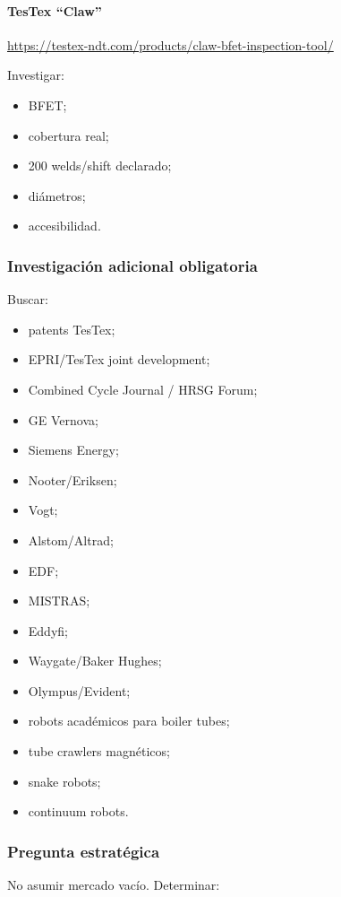 \documentclass[11pt,a4paper]{article}
\begin{document}
\paragraph*{TesTex ``Claw''}
\url{https://testex-ndt.com/products/claw-bfet-inspection-tool/}

Investigar:

\begin{itemize}
\item BFET;
\item cobertura real;
\item 200 welds/shift declarado;
\item diámetros;
\item accesibilidad.
\end{itemize}


\subsubsection*{Investigación adicional obligatoria}
Buscar:

\begin{itemize}
\item patents TesTex;
\item EPRI/TesTex joint development;
\item Combined Cycle Journal / HRSG Forum;
\item GE Vernova;
\item Siemens Energy;
\item Nooter/Eriksen;
\item Vogt;
\item Alstom/Altrad;
\item EDF;
\item MISTRAS;
\item Eddyfi;
\item Waygate/Baker Hughes;
\item Olympus/Evident;
\item robots académicos para boiler tubes;
\item tube crawlers magnéticos;
\item snake robots;
\item continuum robots.
\end{itemize}


\subsubsection*{Pregunta estratégica}
No asumir mercado vacío. Determinar:
\end{document}

